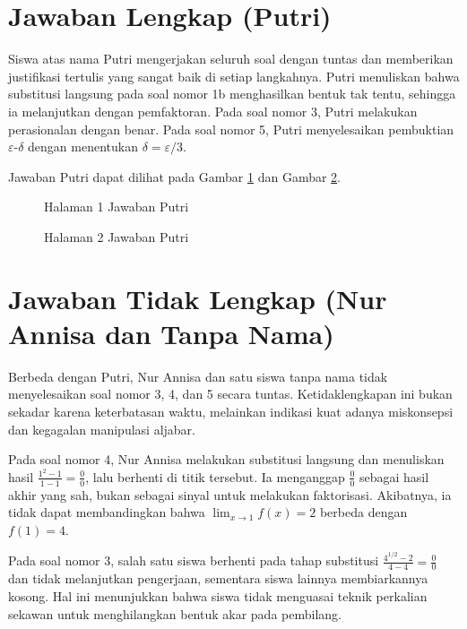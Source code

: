 \documentclass[12pt,a4paper,openany]{book}
\theoremstyle{definition}
\begin{document}
\section{Jawaban Lengkap (Putri)}

Siswa atas nama Putri mengerjakan seluruh soal dengan tuntas dan memberikan justifikasi tertulis yang sangat baik di setiap langkahnya. Putri menuliskan bahwa substitusi langsung pada soal nomor 1b menghasilkan bentuk tak tentu, sehingga ia melanjutkan dengan pemfaktoran. Pada soal nomor 3, Putri melakukan perasionalan dengan benar. Pada soal nomor 5, Putri menyelesaikan pembuktian $\varepsilon$-$\delta$ dengan menentukan $\delta = \varepsilon/3$.

Jawaban Putri dapat dilihat pada Gambar \ref{fig:putri1} dan Gambar \ref{fig:putri2}.

\begin{figure}[h]
\centering
\caption{Halaman 1 Jawaban Putri}
\label{fig:putri1}
\end{figure}

\begin{figure}[h]
\centering
\caption{Halaman 2 Jawaban Putri}
\label{fig:putri2}
\end{figure}

\section{Jawaban Tidak Lengkap (Nur Annisa dan Tanpa Nama)}

Berbeda dengan Putri, Nur Annisa dan satu siswa tanpa nama tidak menyelesaikan soal nomor 3, 4, dan 5 secara tuntas. Ketidaklengkapan ini bukan sekadar karena keterbatasan waktu, melainkan indikasi kuat adanya miskonsepsi dan kegagalan manipulasi aljabar.

Pada soal nomor 4, Nur Annisa melakukan substitusi langsung dan menuliskan hasil $\frac{1^2 - 1}{1 - 1} = \frac{0}{0}$, lalu berhenti di titik tersebut. Ia menganggap $\frac{0}{0}$ sebagai hasil akhir yang sah, bukan sebagai sinyal untuk melakukan faktorisasi. Akibatnya, ia tidak dapat membandingkan bahwa $\lim_{x \to 1} f(x) = 2$ berbeda dengan $f(1) = 4$.

Pada soal nomor 3, salah satu siswa berhenti pada tahap substitusi $\frac{4^{1/2} - 2}{4 - 4} = \frac{0}{0}$ dan tidak melanjutkan pengerjaan, sementara siswa lainnya membiarkannya kosong. Hal ini menunjukkan bahwa siswa tidak menguasai teknik perkalian sekawan untuk menghilangkan bentuk akar pada pembilang.
\end{document}
